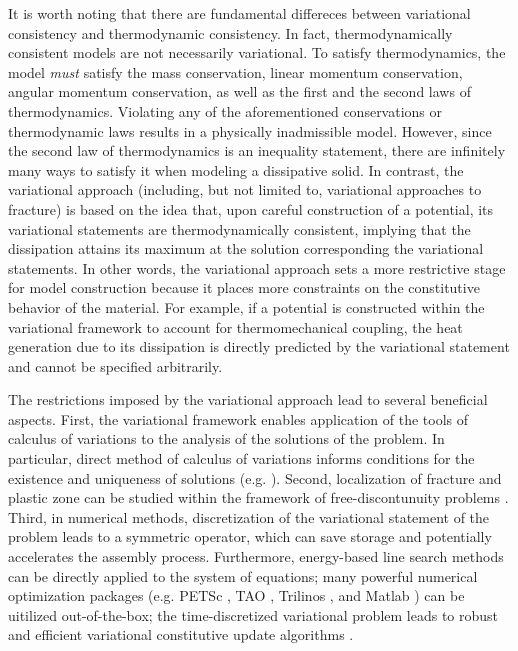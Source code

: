 It is worth noting that there are fundamental differeces between variational consistency and thermodynamic consistency. In fact, thermodynamically consistent models are not necessarily variational. To satisfy thermodynamics, the model \emph{must} satisfy the mass conservation, linear momentum conservation, angular momentum conservation, as well as the first and the second laws of thermodynamics. Violating any of the aforementioned conservations or thermodynamic laws results in a physically inadmissible model. However, since the second law of thermodynamics is an inequality statement, there are infinitely many ways to satisfy it when modeling a dissipative solid. In contrast, the variational approach (including, but not limited to, variational approaches to fracture) is based on the idea that, upon careful construction of a potential, its variational statements are thermodynamically consistent, implying that the dissipation attains its maximum at the solution corresponding the variational statements. In other words, the variational approach sets a more restrictive stage for model construction because it places more constraints on the constitutive behavior of the material. For example, if a potential is constructed within the variational framework to account for thermomechanical coupling, the heat generation due to its dissipation is directly predicted by the variational statement and cannot be specified arbitrarily.

The restrictions imposed by the variational approach lead to several beneficial aspects. First, the variational framework enables application of the tools of calculus of variations to the analysis of the solutions of the problem. In particular, direct method of calculus of variations informs conditions for the existence and uniqueness of solutions (e.g. \cite{dal2012introduction}). Second, localization of fracture and plastic zone can be studied within the framework of free-discontunuity problems \cite{braides1998approximation,gariepy2001functions}. Third, in numerical methods, discretization of the variational statement of the problem leads to a symmetric operator, which can save storage and potentially accelerates the assembly process. Furthermore, energy-based line search methods can be directly applied to the system of equations; many powerful numerical optimization packages (e.g. PETSc \cite{petsc-web-page}, TAO \cite{benson2003tao}, Trilinos \cite{heroux2005overview}, and Matlab \cite{higham2016matlab}) can be uitilized out-of-the-box; the time-discretized variational problem leads to robust and efficient variational constitutive update algorithms \cite{ortiz_1999}.
